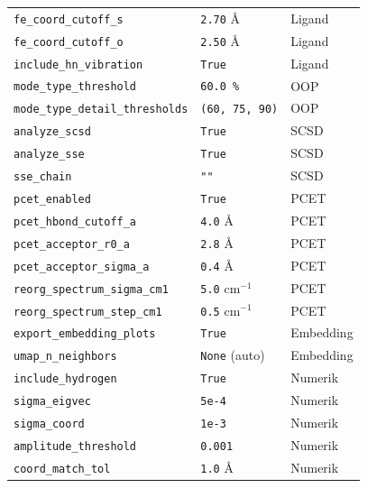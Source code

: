 \documentclass[11pt,a4paper,twoside]{article}
\theoremstyle{remark}
\begin{document}
\begin{longtable}{p{} p{} p{}}
\texttt{fe\_coord\_cutoff\_s}       & \texttt{2.70} \AA    & Ligand \\
\texttt{fe\_coord\_cutoff\_o}       & \texttt{2.50} \AA    & Ligand \\
\texttt{include\_hn\_vibration}     & \texttt{True}        & Ligand \\
\midrule
\texttt{mode\_type\_threshold}      & \texttt{60.0\,\%}    & OOP \\
\texttt{mode\_type\_detail\_thresholds} & \texttt{(60, 75, 90)} & OOP \\
\midrule
\texttt{analyze\_scsd}              & \texttt{True}        & SCSD \\
\texttt{analyze\_sse}                & \texttt{True}        & SCSD \\
\texttt{sse\_chain}                  & \texttt{""}          & SCSD \\
\midrule
\texttt{pcet\_enabled}              & \texttt{True}        & PCET \\
\texttt{pcet\_hbond\_cutoff\_a}     & \texttt{4.0} \AA     & PCET \\
\texttt{pcet\_acceptor\_r0\_a}      & \texttt{2.8} \AA     & PCET \\
\texttt{pcet\_acceptor\_sigma\_a}   & \texttt{0.4} \AA     & PCET \\
\texttt{reorg\_spectrum\_sigma\_cm1} & \texttt{5.0} cm$^{-1}$  & PCET \\
\texttt{reorg\_spectrum\_step\_cm1} & \texttt{0.5} cm$^{-1}$  & PCET \\
\midrule
\texttt{export\_embedding\_plots}   & \texttt{True}        & Embedding \\
\texttt{umap\_n\_neighbors}         & \texttt{None} (auto) & Embedding \\
\midrule
\texttt{include\_hydrogen}          & \texttt{True}        & Numerik \\
\texttt{sigma\_eigvec}              & \texttt{5e-4}        & Numerik \\
\texttt{sigma\_coord}               & \texttt{1e-3}        & Numerik \\
\texttt{amplitude\_threshold}       & \texttt{0.001}       & Numerik \\
\texttt{coord\_match\_tol}          & \texttt{1.0} \AA     & Numerik \\

\end{longtable}
\end{document}

